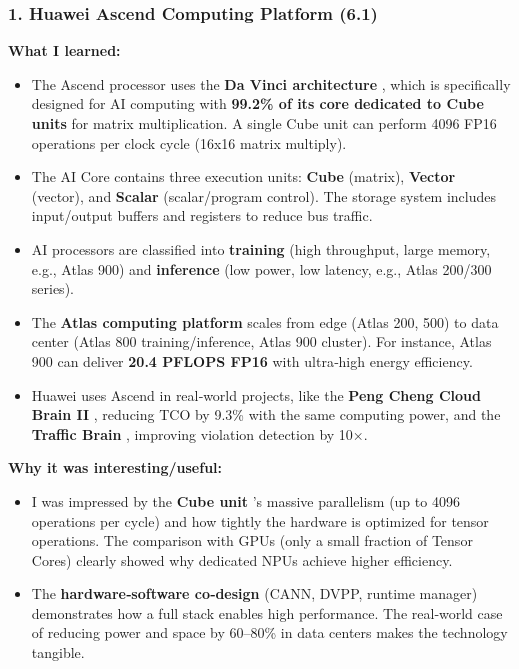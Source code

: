 \hypertarget{huawei-ascend-computing-platform-6.1}{%
\subsubsection{1. Huawei Ascend Computing Platform
(6.1)}\label{huawei-ascend-computing-platform-6.1}}

\textbf{What I learned:}

\begin{itemize}
\tightlist
\item
  The Ascend processor uses the \textbf{Da Vinci architecture} , which
  is specifically designed for AI computing with \textbf{99.2\% of its
  core dedicated to Cube units} for matrix multiplication. A single Cube
  unit can perform 4096 FP16 operations per clock cycle (16x16 matrix
  multiply).
\item
  The AI Core contains three execution units: \textbf{Cube} (matrix),
  \textbf{Vector} (vector), and \textbf{Scalar} (scalar/program
  control). The storage system includes input/output buffers and
  registers to reduce bus traffic.
\item
  AI processors are classified into \textbf{training} (high throughput,
  large memory, e.g., Atlas 900) and \textbf{inference} (low power, low
  latency, e.g., Atlas 200/300 series).
\item
  The \textbf{Atlas computing platform} scales from edge (Atlas 200,
  500) to data center (Atlas 800 training/inference, Atlas 900 cluster).
  For instance, Atlas 900 can deliver \textbf{20.4 PFLOPS FP16} with
  ultra‑high energy efficiency.
\item
  Huawei uses Ascend in real‑world projects, like the \textbf{Peng Cheng
  Cloud Brain II} , reducing TCO by 9.3\% with the same computing power,
  and the \textbf{Traffic Brain} , improving violation detection by 10×.
\end{itemize}

\textbf{Why it was interesting/useful:}

\begin{itemize}
\tightlist
\item
  I was impressed by the \textbf{Cube unit} 's massive parallelism (up
  to 4096 operations per cycle) and how tightly the hardware is
  optimized for tensor operations. The comparison with GPUs (only a
  small fraction of Tensor Cores) clearly showed why dedicated NPUs
  achieve higher efficiency.
\item
  The \textbf{hardware‑software co‑design} (CANN, DVPP, runtime manager)
  demonstrates how a full stack enables high performance. The real‑world
  case of reducing power and space by 60--80\% in data centers makes the
  technology tangible.
\end{itemize}


